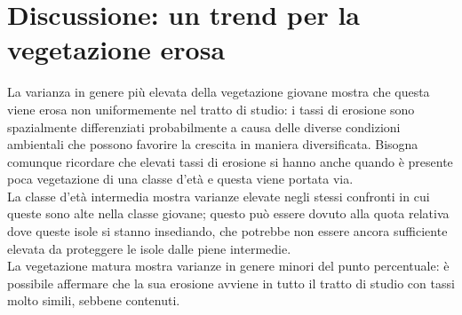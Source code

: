 \section{Discussione: un trend per la vegetazione erosa}
La varianza in genere più elevata della vegetazione giovane mostra che questa viene erosa non uniformemente nel tratto di studio: i tassi di erosione sono spazialmente differenziati probabilmente a causa delle diverse condizioni ambientali che possono favorire la crescita in maniera diversificata.
Bisogna comunque ricordare che elevati tassi di erosione si hanno anche quando è presente poca vegetazione di una classe d'età e questa viene portata via.
\\
La classe d'età intermedia mostra varianze elevate negli stessi confronti in cui queste sono alte nella classe giovane; questo può essere dovuto alla quota relativa dove queste isole si stanno insediando, che potrebbe non essere ancora sufficiente elevata da proteggere le isole dalle piene intermedie.
\\
La vegetazione matura mostra varianze in genere minori del punto percentuale: è possibile affermare che la sua erosione avviene in tutto il tratto di studio con tassi molto simili, sebbene contenuti.

